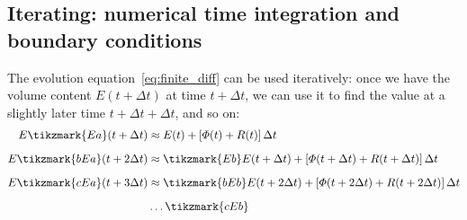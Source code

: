 \documentclass[a4paper,12pt,%
onecolumn,oneside,%
british%
]{memoir}
\newcommand*{\incr}{\Delta}%
\renewcommand*{\|}[1][]{\nonscript\:#1\vert\nonscript\:\mathopen{}}
\newcommand*{\Dt}{\incr t}
\newcommand*{\yE}{E}
\newcommand*{\yH}{\varPhi}%
\newcommand*{\yR}{R}%
\begin{document}
\medskip

\subsection{Iterating: numerical time integration and boundary conditions}
\label{sec:timestep_iterate}

The evolution equation~\eqref{eq:finite_diff} can be used iteratively: once we have the volume content $\yE(t+\Dt)$ at time $t+\Dt$, we can use it to find the value at a slightly later time $t+\Dt+\Dt$, and so on:
\begin{equation}\label{eq:timestepped_evolution}
  \begin{aligned}
   \yE\tikzmark{Ea}(t+\Dt) &\approx
    \yE(t) + [\yH(t) + \yR(t)]\,\Dt
    \\[2\jot]
    \yE\tikzmark{bEa}(t+2\Dt)  &\approx
    \tikzmark{Eb}\yE(t+\Dt) + [\yH(t+\Dt) + \yR(t+\Dt)]\,\Dt
    \\[2\jot]
    \yE\tikzmark{cEa}(t+3\Dt)  &\approx
    \tikzmark{bEb}\yE(t+2\Dt) + [\yH(t+2\Dt) + \yR(t+2\Dt)]\,\Dt
    \\[2\jot]
    &\dotso\tikzmark{cEb}
  \end{aligned}
\end{equation}
\end{document}
